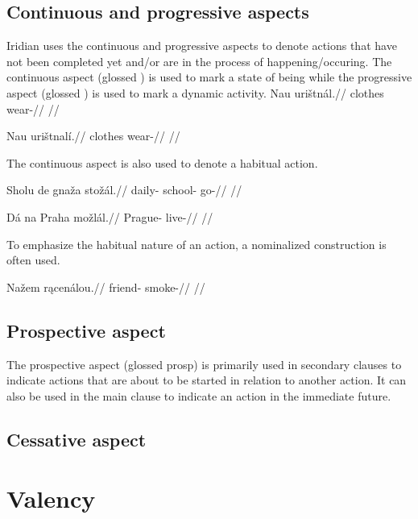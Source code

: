 \subsection{Continuous and progressive aspects}
Iridian uses the continuous and progressive aspects to denote actions that have not been completed yet and/or are in the process of happening/occuring. The continuous aspect (glossed ) is used to mark a state of being while the progressive aspect (glossed ) is used to mark a dynamic activity.
\pex
\begingl
\gla Nau uri\v{s}tn\'al.//
\glb clothes wear-//
\glft {} //
\endgl
\xe

\pex
\begingl
\gla Nau uri\v{s}tnal\'i.//
\glb clothes wear-//
\glft {} //
\endgl
\xe

The continuous aspect is also used to denote a habitual action.

\pex
\begingl
\gla Sholu de gna\v{z}a sto\v{z}\'al.//
\glb daily-  school- go-//
\glft {} //
\endgl
\xe

\pex
\begingl
\gla D\'a na Praha mo\v{z}l\'al.//
\glb {}  Prague- live-//
\glft {} //
\endgl
\xe

To emphasize the habitual nature of an action, a nominalized construction is often used.

\pex
\begingl
\gla Na\v{z}em r\k{a}cen\'alou.//
\glb friend- smoke-//
\glft {} //
\endgl
\xe

\subsection{Prospective aspect}
\par The prospective aspect (glossed {\sc prosp}) is primarily used in secondary clauses to indicate actions that are about to be started in relation to another action. It can also be used in the main clause to indicate an action in the immediate future.

\subsection{Cessative aspect}

\section{Valency}

